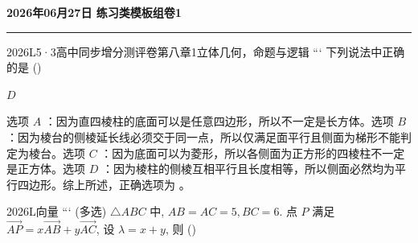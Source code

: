\documentclass[12pt,UTF-8,a4paper]{ctexart}
\newcommand{\mytitle}{}
\numberwithin{figure}{section}
\theoremstyle{mystyle}
\theoremstyle{mystylekaishu}
\theoremstyle{mystyle}
\numberwithin{xiti}{section}
\begin{document}
\thispagestyle{plain} %
\renewcommand{\mytitle}{2026年06月27日 练习类模板组卷1}

\begin{center}
  {\Huge\bfseries\color{structure} \mytitle}
  \vspace{0.5em}
  
  \textcolor{structure}{\rule{\linewidth}{1.5pt}}
\end{center}
\vspace{1em}


\begin{problem}{2026}{L}{5·3高中同步增分测评卷第八章}{1}{立体几何，命题与逻辑}
```
下列说法中正确的是 (\hspace{1cm})
\begin{choices}
\end{choices}
\end{problem}

\begin{answer}
$D$
\end{answer}

\begin{solutions}
选项 $A$ ：因为直四棱柱的底面可以是任意四边形，所以不一定是长方体。选项 $B$ ：因为棱台的侧棱延长线必须交于同一点，所以仅满足面平行且侧面为梯形不能判定为棱台。选项 $C$ ：因为底面可以为菱形，所以各侧面为正方形的四棱柱不一定是正方体。选项 $D$ ：因为棱柱的侧棱互相平行且长度相等，所以侧面必然均为平行四边形。综上所述，正确选项为 。
\end{solutions}


\begin{problem}{2026}{L}{}{}{向量}
```
(多选) $\triangle ABC$ 中, $AB=AC=5, BC=6$. 点 $P$ 满足 $\overrightarrow{AP}=x \overrightarrow{AB}+y \overrightarrow{AC}$, 设 $\lambda=x+y$, 则 (\hspace{1cm})
\begin{choices}
\end{choices}
\end{problem}
\end{document}
